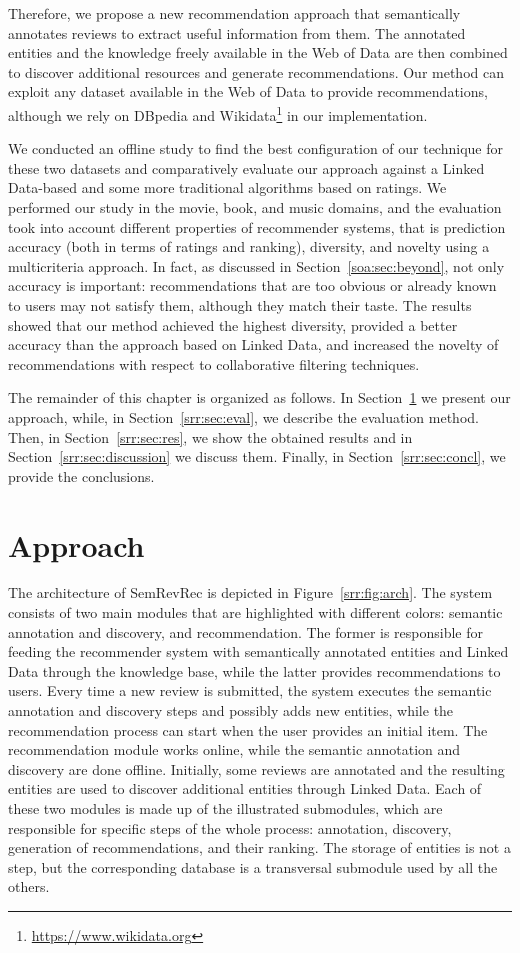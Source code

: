 Therefore, we propose a new recommendation approach that semantically annotates reviews to extract useful information from them. The annotated entities and the knowledge freely available in the Web of Data are then combined to discover additional resources and generate recommendations. Our method can exploit any dataset available in the Web of Data to provide recommendations, although we rely on DBpedia and Wikidata\footnote{\url{https://www.wikidata.org}} in our implementation. 

We conducted an offline study to find the best configuration of our technique for these two datasets and comparatively evaluate our approach against a Linked Data-based and some more traditional algorithms based on ratings. We performed our study in the movie, book, and music domains, and the evaluation took into account different properties of recommender systems, that is prediction accuracy (both in terms of ratings and ranking), diversity, and novelty using a multicriteria approach. In fact, as discussed in Section~\ref{soa:sec:beyond}, not only accuracy is important: recommendations that are too obvious or already known to users may not satisfy them, although they match their taste. The results showed that our method achieved the highest diversity, provided a better accuracy than the approach based on Linked Data, and increased the novelty of recommendations with respect to collaborative filtering techniques.

The remainder of this chapter is organized as follows. In Section~\ref{srr:sec:approach} we present our approach, while, in Section~\ref{srr:sec:eval}, we describe the evaluation method. Then, in Section~\ref{srr:sec:res}, we show the obtained results and in Section~\ref{srr:sec:discussion} we discuss them. Finally, in Section~\ref{srr:sec:concl}, we provide the conclusions.

\section{Approach}
\label{srr:sec:approach}

The architecture of SemRevRec is depicted in Figure~\ref{srr:fig:arch}. The system consists of two main modules that are highlighted with different colors: semantic annotation and discovery, and recommendation. The former is responsible for feeding the recommender system with semantically annotated entities and Linked Data through the knowledge base, while the latter provides recommendations to users. Every time a new review is submitted, the system executes the semantic annotation and discovery steps and possibly adds new entities, while the recommendation process can start when the user provides an initial item. The recommendation module works online, while the semantic annotation and discovery are done offline. Initially, some reviews are annotated and the resulting entities are used to discover additional entities through Linked Data. Each of these two modules is made up of the illustrated submodules, which are responsible for specific steps of the whole process: annotation, discovery, generation of recommendations, and their ranking. The storage of entities is not a step, but the corresponding database is a transversal submodule used by all the others. 

